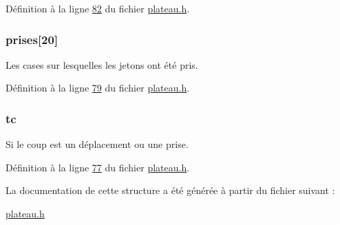 Définition à la ligne \hyperlink{plateau_8h_source_l00082}{82} du fichier \hyperlink{plateau_8h_source}{plateau.h}.

\hypertarget{structcoup_ae19b3a66d3f4e66b8f69a38e4005f44a}{
\subsubsection[{prises}]{ {\bf prises}\mbox{[}20\mbox{]}}}
\label{structcoup_ae19b3a66d3f4e66b8f69a38e4005f44a}
Les cases sur lesquelles les jetons ont été pris. 

Définition à la ligne \hyperlink{plateau_8h_source_l00079}{79} du fichier \hyperlink{plateau_8h_source}{plateau.h}.

\hypertarget{structcoup_aa33da004dccb192cb33bc00c26c6e859}{
\subsubsection[{tc}]{ {\bf tc}}}
\label{structcoup_aa33da004dccb192cb33bc00c26c6e859}
Si le coup est un déplacement ou une prise. 

Définition à la ligne \hyperlink{plateau_8h_source_l00077}{77} du fichier \hyperlink{plateau_8h_source}{plateau.h}.



La documentation de cette structure a été générée à partir du fichier suivant :\begin{DoxyCompactItemize}
\item 
\hyperlink{plateau_8h}{plateau.h}\end{DoxyCompactItemize}
